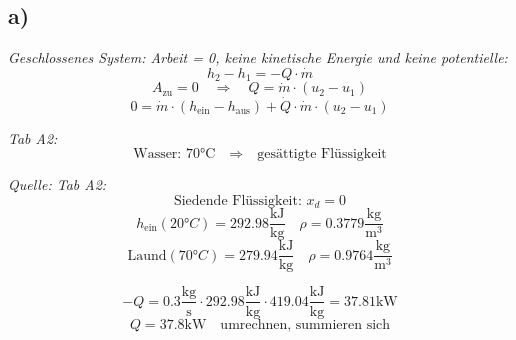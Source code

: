 

\subsection*{a)}
\textit{Geschlossenes System: Arbeit = 0, keine kinetische Energie und keine potentielle:}
\[
h_2 - h_1 = -Q \cdot \dot{m}
\]
\[
A_{\text{zu}} = 0 \quad \Rightarrow \quad Q = \dot{m} \cdot (u_2 - u_1)
\]
\[
0 = \dot{m} \cdot (h_{\text{ein}} - h_{\text{aus}}) + \dot{Q} \cdot \dot{m} \cdot (u_2 - u_1)
\]

\textit{Tab A2:}
\[
\text{Wasser: 70°C} \quad \Rightarrow \quad \text{gesättigte Flüssigkeit}
\]

\textit{Quelle: Tab A2:}
\[
\text{Siedende Flüssigkeit: } x_d = 0
\]
\[
h_{\text{ein}}(20°C) = 292.98 \frac{\text{kJ}}{\text{kg}} \quad \rho = 0.3779 \frac{\text{kg}}{\text{m}^3}
\]
\[
\text{Laund}(70°C) = 279.94 \frac{\text{kJ}}{\text{kg}} \quad \rho = 0.9764 \frac{\text{kg}}{\text{m}^3}
\]

\[
-Q = 0.3 \frac{\text{kg}}{\text{s}} \cdot 292.98 \frac{\text{kJ}}{\text{kg}} \cdot 419.04 \frac{\text{kJ}}{\text{kg}} = 37.81 \text{kW}
\]
\[
Q = 37.8 \text{kW} \quad \text{umrechnen, summieren sich}
\]